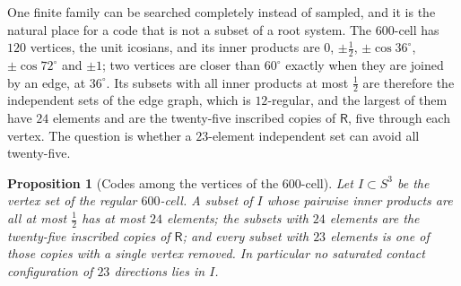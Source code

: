 \documentclass[11pt,reqno]{amsart}
\renewcommand{\_}{\origunderscore\allowbreak}
\numberwithin{equation}{section}
\theoremstyle{plain}
\newtheorem{prop}[thm]{Proposition}
\theoremstyle{definition}
\theoremstyle{remark}
\newcommand{\Rt}{\mathsf{R}}                 %
\begin{document}
One finite family can be searched completely instead of sampled, and it
is the natural place for a code that is not a subset of a root system.
The $600$-cell has $120$ vertices, the unit icosians, and its
inner products are $0$, $\pm\tfrac12$, $\pm\cos36^\circ$,
$\pm\cos72^\circ$ and $\pm1$; two vertices are closer than $60^\circ$
exactly when they are joined by an edge, at $36^\circ$. Its subsets with
all inner products at most $\tfrac12$ are therefore the independent sets
of the edge graph, which is $12$-regular, and the largest of them have
$24$ elements and are the twenty-five inscribed copies of $\Rt$, five
through each vertex. The question is whether a $23$-element independent
set can avoid all twenty-five.

\begin{prop}[Codes among the vertices of the $600$-cell]\label{prop:cell600}
Let $I\subset S^3$ be the vertex set of the regular $600$-cell. A subset
of $I$ whose pairwise inner products are all at most $\tfrac12$ has at
most $24$ elements; the subsets with $24$ elements are the twenty-five
inscribed copies of $\Rt$; and every subset with $23$ elements is one of
those copies with a single vertex removed. In particular no saturated
contact configuration of $23$ directions lies in $I$.
\end{prop}
\end{document}
